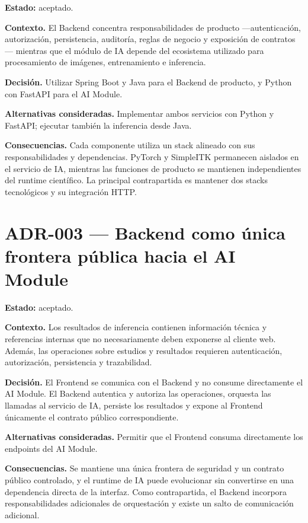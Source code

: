 \textbf{Estado:} aceptado.

\textbf{Contexto.} El Backend concentra responsabilidades de producto —autenticación, autorización, persistencia, auditoría, reglas de negocio y exposición de contratos— mientras que el módulo de IA depende del ecosistema utilizado para procesamiento de imágenes, entrenamiento e inferencia.

\textbf{Decisión.} Utilizar Spring Boot y Java para el Backend de producto, y Python con FastAPI para el AI Module.

\textbf{Alternativas consideradas.} Implementar ambos servicios con Python y FastAPI; ejecutar también la inferencia desde Java.

\textbf{Consecuencias.} Cada componente utiliza un stack alineado con sus responsabilidades y dependencias. PyTorch y SimpleITK permanecen aislados en el servicio de IA, mientras las funciones de producto se mantienen independientes del runtime científico. La principal contrapartida es mantener dos stacks tecnológicos y su integración HTTP.

\section*{ADR-003 --- Backend como única frontera pública hacia el AI Module}
{}
\label{adr:003-backend-frontera-publica-ai}

\textbf{Estado:} aceptado.

\textbf{Contexto.} Los resultados de inferencia contienen información técnica y referencias internas que no necesariamente deben exponerse al cliente web. Además, las operaciones sobre estudios y resultados requieren autenticación, autorización, persistencia y trazabilidad.

\textbf{Decisión.} El Frontend se comunica con el Backend y no consume directamente el AI Module. El Backend autentica y autoriza las operaciones, orquesta las llamadas al servicio de IA, persiste los resultados y expone al Frontend únicamente el contrato público correspondiente.

\textbf{Alternativas consideradas.} Permitir que el Frontend consuma directamente los endpoints del AI Module.

\textbf{Consecuencias.} Se mantiene una única frontera de seguridad y un contrato público controlado, y el runtime de IA puede evolucionar sin convertirse en una dependencia directa de la interfaz. Como contrapartida, el Backend incorpora responsabilidades adicionales de orquestación y existe un salto de comunicación adicional.

